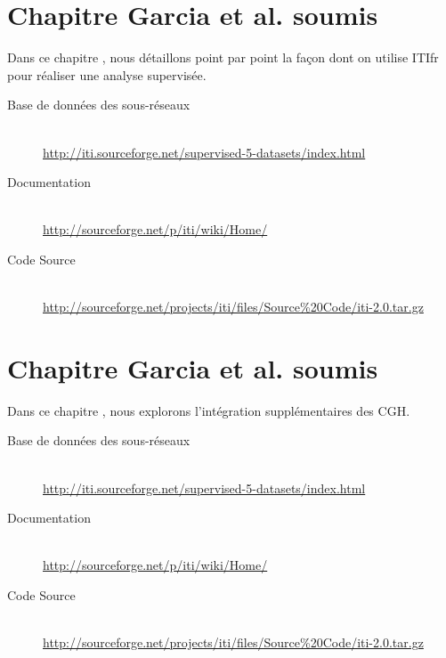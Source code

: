 		

			\section{\textcolor{white!15!black}{Chapitre Garcia et al. soumis}}\label{app:Garcia2013}
				Dans ce chapitre \citet{Garcia2013}, nous détaillons point par point la façon dont on utilise \acs{ITIfr} pour réaliser une analyse supervisée.

				\begin{description}
					\item [Base de données des sous-réseaux]    \hfill \\
						\url{http://iti.sourceforge.net/supervised-5-datasets/index.html}
					\item [Documentation]                       \hfill \\
						\url{http://sourceforge.net/p/iti/wiki/Home/}
					\item [Code Source]                         \hfill \\
						\url{http://sourceforge.net/projects/iti/files/Source%20Code/iti-2.0.tar.gz}
				\end{description}

				

			\section{\textcolor{white!15!black}{Chapitre Garcia et al. soumis}}\label{app:Garcia2013b}
				Dans ce chapitre \citet{Garcia2013b}, nous explorons l'intégration supplémentaires des CGH.

				\begin{description}
					\item [Base de données des sous-réseaux]    \hfill \\
						\url{http://iti.sourceforge.net/supervised-5-datasets/index.html}
					\item [Documentation]                       \hfill \\
						\url{http://sourceforge.net/p/iti/wiki/Home/}
					\item [Code Source]                         \hfill \\
						\url{http://sourceforge.net/projects/iti/files/Source%20Code/iti-2.0.tar.gz}
				\end{description}

				
